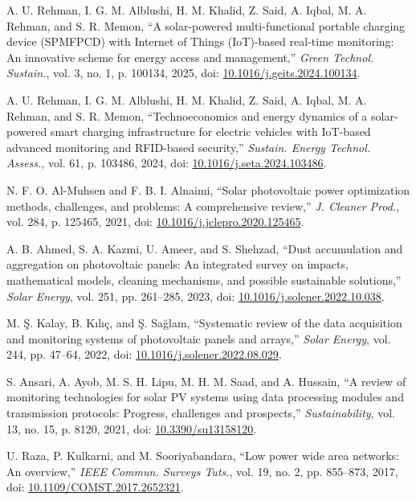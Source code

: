 \documentclass{ieeeaccess}
\begin{document}
\begin{thebibliography}{00}


A. U. Rehman, I. G. M. Alblushi, H. M. Khalid, Z. Said, A. Iqbal, M. A. Rehman, and S. R. Memon, “A solar-powered multi-functional portable charging device (SPMFPCD) with Internet of Things (IoT)-based real-time monitoring: An innovative scheme for energy access and management,” \emph{Green Technol. Sustain.}, vol. 3, no. 1, p. 100134, 2025, doi: \url{10.1016/j.geits.2024.100134}.


A. U. Rehman, I. G. M. Alblushi, H. M. Khalid, Z. Said, A. Iqbal, M. A. Rehman, and S. R. Memon, “Technoeconomics and energy dynamics of a solar-powered smart charging infrastructure for electric vehicles with IoT-based advanced monitoring and RFID-based security,” \emph{Sustain. Energy Technol. Assess.}, vol. 61, p. 103486, 2024, doi: \url{10.1016/j.seta.2024.103486}.

N. F. O. Al-Muhsen and F. B. I. Alnaimi, “Solar photovoltaic power optimization methods, challenges, and problems: A comprehensive review,” \emph{J. Cleaner Prod.}, vol. 284, p. 125465, 2021, doi: \url{10.1016/j.jclepro.2020.125465}.

A. B. Ahmed, S. A. Kazmi, U. Ameer, and S. Shehzad, “Dust accumulation and aggregation on photovoltaic panels: An integrated survey on impacts, mathematical models, cleaning mechanisms, and possible sustainable solutions,” \emph{Solar Energy}, vol. 251, pp. 261–285, 2023, doi: \url{10.1016/j.solener.2022.10.038}.

M. Ş. Kalay, B. Kılıç, and Ş. Sağlam, “Systematic review of the data acquisition and monitoring systems of photovoltaic panels and arrays,” \emph{Solar Energy}, vol. 244, pp. 47–64, 2022, doi: \url{10.1016/j.solener.2022.08.029}.

S. Ansari, A. Ayob, M. S. H. Lipu, M. H. M. Saad, and A. Hussain, “A review of monitoring technologies for solar PV systems using data processing modules and transmission protocols: Progress, challenges and prospects,” \emph{Sustainability}, vol. 13, no. 15, p. 8120, 2021, doi: \url{10.3390/su13158120}.

U. Raza, P. Kulkarni, and M. Sooriyabandara, “Low power wide area networks: An overview,” \emph{IEEE Commun. Surveys Tuts.}, vol. 19, no. 2, pp. 855–873, 2017, doi: \url{10.1109/COMST.2017.2652321}.


\end{thebibliography}
\end{document}
